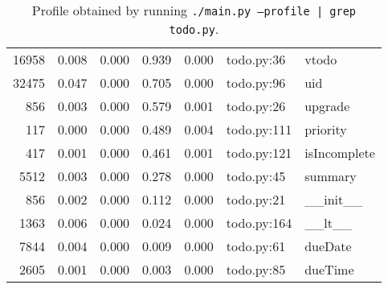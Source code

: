 \documentclass{prettytex/ox/mmsc-special-topic}
\begin{document}
  \begin{table}[H]
    \centering
    \caption{Profile obtained by running \texttt{./main.py --profile | grep todo.py}.}
    \begin{tabular}{rrrrrll}
      16958 & 0.008 & 0.000 & 0.939 & 0.000 & todo.py:36  & vtodo        \\
      32475 & 0.047 & 0.000 & 0.705 & 0.000 & todo.py:96  & uid          \\
      856   & 0.003 & 0.000 & 0.579 & 0.001 & todo.py:26  & upgrade      \\
      117   & 0.000 & 0.000 & 0.489 & 0.004 & todo.py:111 & priority     \\
      417   & 0.001 & 0.000 & 0.461 & 0.001 & todo.py:121 & isIncomplete \\
      5512  & 0.003 & 0.000 & 0.278 & 0.000 & todo.py:45  & summary      \\
      856   & 0.002 & 0.000 & 0.112 & 0.000 & todo.py:21  & \_\_init\_\_ \\
      1363  & 0.006 & 0.000 & 0.024 & 0.000 & todo.py:164 & \_\_lt\_\_   \\
      7844  & 0.004 & 0.000 & 0.009 & 0.000 & todo.py:61  & dueDate      \\
      2605  & 0.001 & 0.000 & 0.003 & 0.000 & todo.py:85  & dueTime      \\
    \end{tabular}
  \end{table}

  \pagebreak
  \printbibliography
  \printnoidxglossary[type=acronym]

\end{document}
